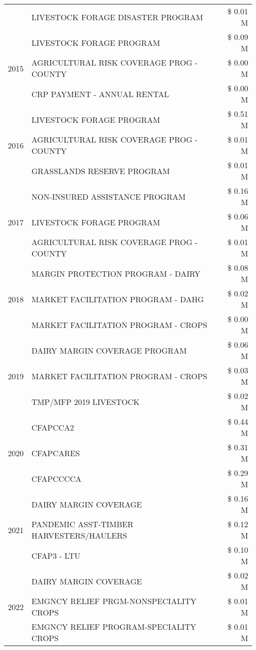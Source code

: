 \begin{tabular}{llr}
 & LIVESTOCK FORAGE DISASTER PROGRAM & \$ 0.01 M \\
\cline{1-3}
\multirow[t]{3}{*}{2015} & LIVESTOCK FORAGE PROGRAM & \$ 0.09 M \\
 & AGRICULTURAL RISK COVERAGE PROG - COUNTY & \$ 0.00 M \\
 & CRP PAYMENT - ANNUAL RENTAL & \$ 0.00 M \\
\cline{1-3}
\multirow[t]{3}{*}{2016} & LIVESTOCK FORAGE PROGRAM & \$ 0.51 M \\
 & AGRICULTURAL RISK COVERAGE PROG - COUNTY & \$ 0.01 M \\
 & GRASSLANDS RESERVE PROGRAM & \$ 0.01 M \\
\cline{1-3}
\multirow[t]{3}{*}{2017} & NON-INSURED ASSISTANCE PROGRAM & \$ 0.16 M \\
 & LIVESTOCK FORAGE PROGRAM & \$ 0.06 M \\
 & AGRICULTURAL RISK COVERAGE PROG - COUNTY & \$ 0.01 M \\
\cline{1-3}
\multirow[t]{3}{*}{2018} & MARGIN PROTECTION PROGRAM - DAIRY & \$ 0.08 M \\
 & MARKET FACILITATION PROGRAM - DAHG & \$ 0.02 M \\
 & MARKET FACILITATION PROGRAM - CROPS & \$ 0.00 M \\
\cline{1-3}
\multirow[t]{3}{*}{2019} & DAIRY MARGIN COVERAGE PROGRAM & \$ 0.06 M \\
 & MARKET FACILITATION PROGRAM - CROPS & \$ 0.03 M \\
 & TMP/MFP 2019 LIVESTOCK & \$ 0.02 M \\
\cline{1-3}
\multirow[t]{3}{*}{2020} & CFAPCCA2 & \$ 0.44 M \\
 & CFAPCARES & \$ 0.31 M \\
 & CFAPCCCCA & \$ 0.29 M \\
\cline{1-3}
\multirow[t]{3}{*}{2021} & DAIRY MARGIN COVERAGE & \$ 0.16 M \\
 & PANDEMIC ASST-TIMBER HARVESTERS/HAULERS & \$ 0.12 M \\
 & CFAP3 - LTU & \$ 0.10 M \\
\cline{1-3}
\multirow[t]{3}{*}{2022} & DAIRY MARGIN COVERAGE & \$ 0.02 M \\
 & EMGNCY RELIEF PRGM-NONSPECIALITY CROPS & \$ 0.01 M \\
 & EMGNCY RELIEF PROGRAM-SPECIALITY CROPS & \$ 0.01 M \\
\cline{1-3}
\bottomrule
\end{tabular}
